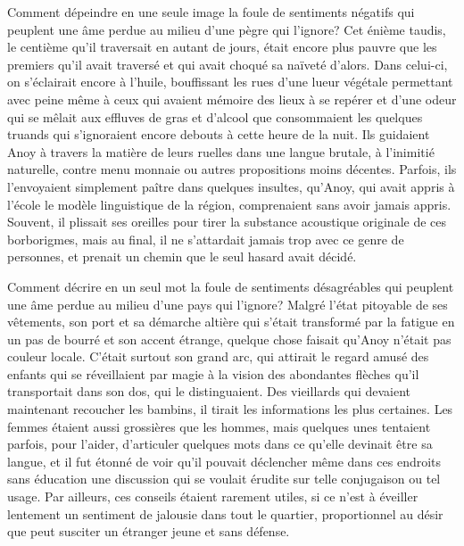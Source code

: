 Comment dépeindre en une seule image la foule de sentiments négatifs
qui peuplent une âme perdue au milieu d'une pègre qui l'ignore? Cet
énième taudis, le centième qu'il traversait en autant de jours, était
encore plus pauvre que les premiers qu'il avait traversé et qui avait
choqué sa naïveté d'alors. Dans celui-ci, on s'éclairait encore à
l'huile, bouffissant les rues d'une lueur végétale permettant avec
peine même à ceux qui avaient mémoire des lieux à se repérer et d'une
odeur qui se mêlait aux effluves de gras et d'alcool que consommaient
les quelques truands qui s'ignoraient encore debouts à cette heure de
la nuit. Ils guidaient Anoy à travers la matière de leurs ruelles dans
une langue brutale, à l'inimitié naturelle, contre menu monnaie ou
autres propositions moins décentes. Parfois, ils l'envoyaient
simplement paître dans quelques insultes, qu'Anoy, qui avait appris à
l'école le modèle linguistique de la région, comprenaient sans avoir
jamais appris. Souvent, il plissait ses oreilles pour tirer la
substance acoustique originale de ces borborigmes, mais au final, il
ne s'attardait jamais trop avec ce genre de personnes, et prenait un
chemin que le seul hasard avait décidé.

Comment décrire en un seul mot la foule de sentiments désagréables qui
peuplent une âme perdue au milieu d'une pays qui l'ignore?  Malgré
l'état pitoyable de ses vêtements, son port et sa démarche altière qui
s'était transformé par la fatigue en un pas de bourré et son accent
étrange, quelque chose faisait qu'Anoy n'était pas couleur
locale. C'était surtout son grand arc, qui attirait le regard amusé
des enfants qui se réveillaient par magie à la vision des abondantes
flèches qu'il transportait dans son dos, qui le distinguaient. Des
vieillards qui devaient maintenant recoucher les bambins, il tirait
les informations les plus certaines. Les femmes étaient aussi
grossières que les hommes, mais quelques unes tentaient parfois, pour
l'aider, d'articuler quelques mots dans ce qu'elle devinait être sa
langue, et il fut étonné de voir qu'il pouvait déclencher même dans
ces endroits sans éducation une discussion qui se voulait érudite sur
telle conjugaison ou tel usage. Par ailleurs, ces conseils étaient
rarement utiles, si ce n'est à éveiller lentement un sentiment de
jalousie dans tout le quartier, proportionnel au désir que peut
susciter un étranger jeune et sans défense.

